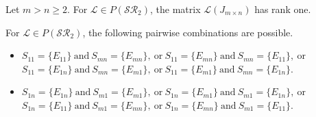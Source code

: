 \documentclass[10pt,a4paper]{amsart}
\begin{document}
	\begin{prop}\label{Proposition_L(J)_rank_1}
		Let $m>n\geq2$. For $\mathcal{L}\in P(\mathcal{SR}_2)$, the matrix $\mathcal{L}(J_{m\times n})$ has rank one.
	\end{prop}

	\begin{prop}\label{SR_rectangle_S11Smn_S1nSm1_combo} 
		For $\mathcal{L}\in P(\mathcal{SR}_2)$, the following pairwise combinations are possible.
		\begin{itemize}
			\item[(i)] $S_{11}=\{E_{11}\} ~\text{and}~ S_{mn}=\{E_{mn}\}, ~\text{or}~ S_{11}=\{E_{mn}\} ~\text{and}~ S_{mn}=\{E_{11}\}, ~\text{or}$ \\
			$S_{11}=\{E_{1n}\} ~\text{and}~ S_{mn}=\{E_{m1}\}, ~\text{or}~ S_{11}=\{E_{m1}\} ~\text{and}~ S_{mn}=\{E_{1n}\}$.
			
			\item[(ii)] $S_{1n}=\{E_{1n}\} ~\text{and}~ S_{m1}=\{E_{m1}\},~\text{or}~ S_{1n}=\{E_{m1}\} ~\text{and}~ S_{m1}=\{E_{1n}\}, ~\text{or}$ \\
			$S_{1n}=\{E_{11}\} ~\text{and}~ S_{m1}=\{E_{mn}\},~\text{or}~ S_{1n}=\{E_{mn}\} ~\text{and}~ S_{m1}=\{E_{11}\}$.
		\end{itemize}
	\end{prop}
\end{document}
